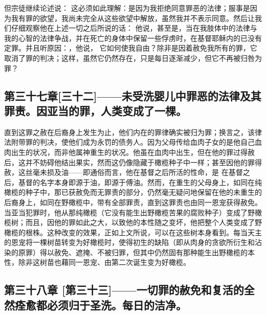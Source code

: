 但宗徒继续论述说：  这必须如此理解：是因为我拒绝同意罪恶的法律；服事是因为我有罪的欲望，我尚未完全从这些欲望中解放，虽然我并不表示同意。然后让我们仔细观察他在上述一切之后所说的话：  他说，甚至是，当在我肢体中的法律与我的心智的法律争战，并在死亡的身体中保留一些俘虏时，在基督耶稣内的已没有定罪。并且听原因：，他说，  它如何使我自由？除非是因着赦免我所有的罪，它取消了罪的判决；这样，虽然它仍然存在，只是每日逐渐减少，但它不再被归咎为罪？\par


\subsection{第三十七章[三十二]——未受洗婴儿中罪恶的法律及其罪责。因亚当的罪，人类变成了一棵。}

直到这罪之赦在后裔身上发生为止，他们内在的罪律确实被归为罪；换言之，该律法附带罪的判决，使他们成为永罚的债务人。因为父母传给血肉子女的是他自己血肉出生的状况，而非他属神重生的状况。他虽在血肉中出生，但在他的罪过得赦后，这并不妨碍他结出果实，然而这仍像隐藏于橄榄种子中一样；甚至因他的罪得赦，这丝毫未损及油——即通俗而言，他在基督之后所活的性命，是  在基督之后，基督的名字本身即源于油，即源于傅油。然而，在重生的父母身上，如同在纯橄榄的种子中，那已获赦免而无罪责的部分，仍然毫无疑问地保留在他的未重生的后裔身上，如同在野橄榄中，带有全部罪责，直到这罪责也由同一恩宠获得赦免。当亚当犯罪时，他从那纯橄榄（它没有能生出野橄榄苦果的腐败种子）变成了野橄榄树；而且，因他的罪如此之大，以致他的本性随之变坏，他把整个人类变成了野橄榄的根株。这种改变的效果，正如上文所说，可以在这些树本身看到。每当天主的恩宠将一棵树苗转变为好橄榄时，使得初生的缺陷（即从肉身的贪欲所衍生和沾染的原罪）得以赦免、遮掩、不被归罪，但其中仍然固有那种能生出野橄榄的本性，除非这树苗也藉同一恩宠、由第二次诞生变为好橄榄。\par


\subsection{第三十八章 [第三十三]——一切罪的赦免和复活的全然痊愈都必须归于圣洗。每日的洁净。}

